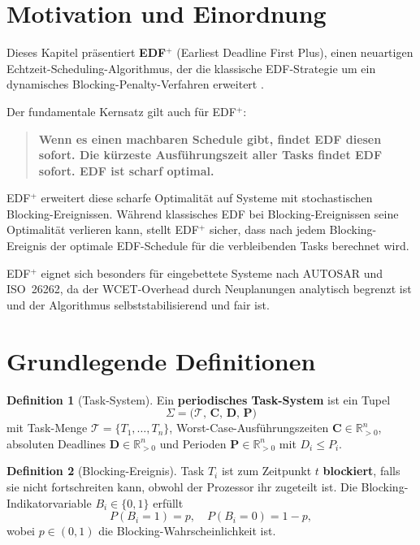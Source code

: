﻿\documentclass[a4paper,12pt]{report}
\theoremstyle{definition}
\newtheorem{definition}{Definition}[chapter]
\begin{document}
\section{Motivation und Einordnung}

Dieses Kapitel präsentiert \textbf{EDF$^+$} (Earliest Deadline First Plus),
einen neuartigen Echtzeit-Scheduling-Algorithmus, der die klassische EDF-Strategie
um ein dynamisches Blocking-Penalty-Verfahren erweitert \cite{Epp2026}.

Der fundamentale Kernsatz gilt auch für EDF$^+$:

\begin{quote}
\textbf{Wenn es einen machbaren Schedule gibt, findet EDF diesen sofort.
Die kürzeste Ausführungszeit aller Tasks findet EDF sofort. EDF ist scharf optimal.}
\end{quote}

EDF$^+$ erweitert diese scharfe Optimalität auf Systeme mit stochastischen
Blocking-Ereignissen. Während klassisches EDF bei Blocking-Ereignissen seine
Optimalität verlieren kann, stellt EDF$^+$ sicher, dass nach jedem
Blocking-Ereignis der optimale EDF-Schedule für die verbleibenden Tasks
berechnet wird.

EDF$^+$ eignet sich besonders für eingebettete Systeme nach AUTOSAR und
ISO~26262, da der WCET-Overhead durch Neuplanungen analytisch begrenzt ist
und der Algorithmus selbststabilisierend und fair ist.

\section{Grundlegende Definitionen}

\begin{definition}[Task-System]
	Ein \textbf{periodisches Task-System} ist ein Tupel
	\[
		\Sigma = \bigl(\mathcal{T},\, \mathbf{C},\, \mathbf{D},\, \mathbf{P}\bigr)
	\]
	mit Task-Menge $\mathcal{T} = \{T_1,\ldots,T_n\}$, Worst-Case-Ausführungszeiten
	$\mathbf{C} \in \mathbb{R}_{>0}^n$, absoluten Deadlines $\mathbf{D} \in \mathbb{R}_{>0}^n$
	und Perioden $\mathbf{P} \in \mathbb{R}_{>0}^n$ mit $D_i \le P_i$.
\end{definition}

\begin{definition}[Blocking-Ereignis]
	Task $T_i$ ist zum Zeitpunkt $t$ \textbf{blockiert}, falls sie nicht
	fortschreiten kann, obwohl der Prozessor ihr zugeteilt ist. Die Blocking-Indikatorvariable $B_i \in \{0,1\}$ erfüllt
	\[
		P(B_i = 1) = p, \quad P(B_i = 0) = 1-p,
	\]
	wobei $p \in (0,1)$ die Blocking-Wahrscheinlichkeit ist.
\end{definition}
\end{document}
